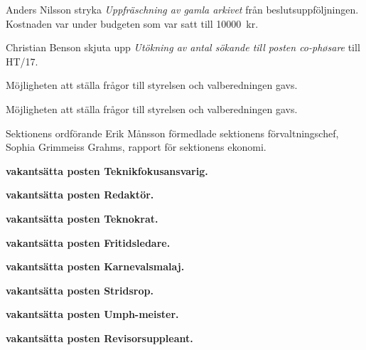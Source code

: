 \documentclass[10pt]{article}
\begin{document}
\begin{paragrafer}
\Mbaby

Anders Nilsson \ypa stryka \emph{Uppfräschning av gamla arkivet} från beslutsuppföljningen. Kostnaden var under budgeten som var satt till \SI{10000}{kr}.

\Mbaby

Christian Benson \ypa skjuta upp \emph{Utökning av antal sökande till posten co-phøsare} till HT/17.

\Mbaby

Möjligheten att ställa frågor till styrelsen och valberedningen gavs.

Möjligheten att ställa frågor till styrelsen och valberedningen gavs.

Sektionens ordförande Erik Månsson förmedlade sektionens förvaltningschef, Sophia Grimmeiss Grahms, rapport för sektionens ekonomi.


\begin{paragrafer}


\textbf{\Mba vakantsätta posten Teknikfokusansvarig.}\par

\textbf{\Mba vakantsätta posten Redaktör.}\par

\textbf{\Mba vakantsätta posten Teknokrat.}\par

\textbf{\Mba vakantsätta posten Fritidsledare.}\par

\textbf{\Mba vakantsätta posten Karnevalsmalaj.}\par

\textbf{\Mba vakantsätta posten Stridsrop.}\par

\textbf{\Mba vakantsätta posten Umph-meister.}\par

\textbf{\Mba vakantsätta posten Revisorsuppleant.}\par
\end{paragrafer}
\end{paragrafer}
\end{document}
